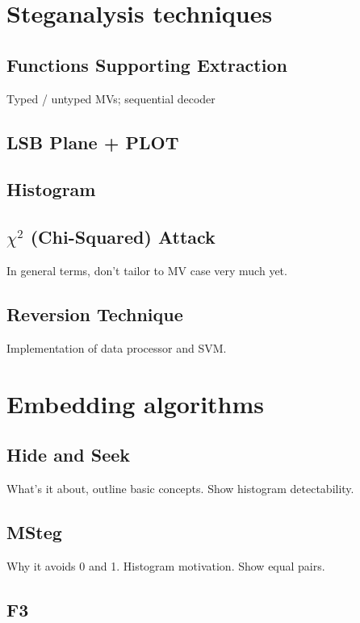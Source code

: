 \documentclass[12pt,british,twoside,notitlepage,usenames,dvipsnames,hypens,final]{report}
\numberwithin{equation}{section}
\numberwithin{figure}{section}
\begin{document}
\section{Steganalysis techniques}

\subsection{Functions Supporting Extraction}

Typed / untyped MVs; sequential decoder

\subsection{LSB Plane + PLOT}

\subsection{Histogram}

\subsection{$\chi^2$ (Chi-Squared) Attack}

In general terms, don't tailor to MV case very much yet.

\subsection{Reversion Technique}
Implementation of data processor and SVM.

\section{Embedding algorithms}
\label{emb-alg}

\subsection{Hide and Seek}

What's it about, outline basic concepts. Show histogram detectability.

\subsection{MSteg}

Why it avoids 0 and 1. Histogram motivation. Show equal pairs.

\subsection{F3}
\end{document}
